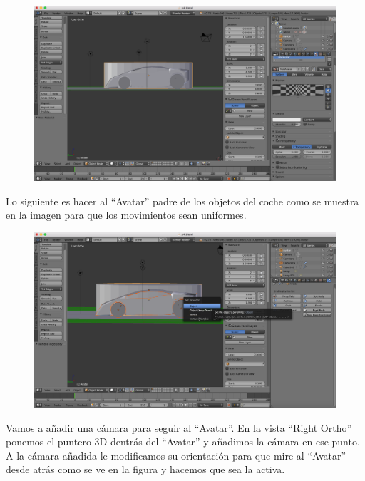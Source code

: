 \documentclass[10pt]{article}
\begin{document}
\begin{figure}[H]
	\begin{center}
	 		\includegraphics[width = 1.00\textwidth]{Imagenes/p4-img17}
	\end{center} 
\end{figure}

Lo siguiente es hacer al ``Avatar'' padre de los objetos del coche como se muestra en la imagen para que los movimientos sean uniformes. \\

\begin{figure}[H]
	\begin{center}
	 		\includegraphics[width = 1.00\textwidth]{Imagenes/p4-img18}
	\end{center} 
\end{figure}

Vamos a añadir una cámara para seguir al ``Avatar''. En la vista ``Right Ortho'' ponemos el puntero 3D dentrás del ``Avatar'' y añadimos la cámara en ese punto. A la cámara añadida le modificamos su orientación para que mire al ``Avatar'' desde atrás como se ve en la figura y hacemos que sea la activa. \\
\end{document}

